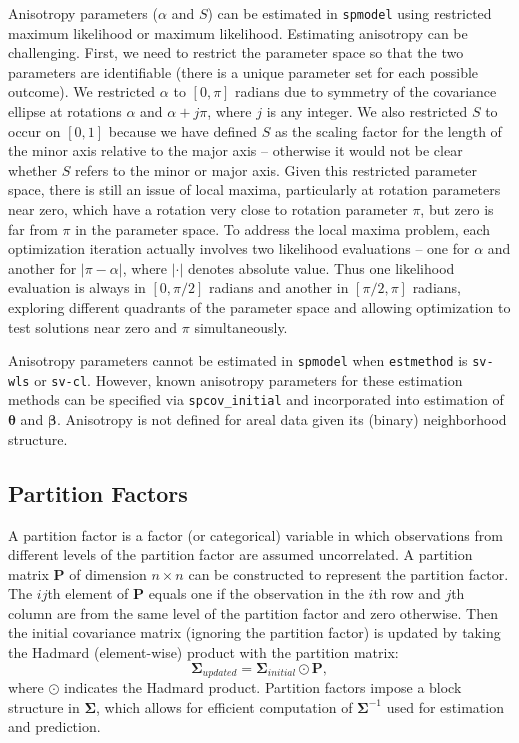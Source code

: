 \documentclass[10pt,letterpaper]{article}
\begin{document}
Anisotropy parameters (\(\alpha\) and \(S\)) can be estimated in
\texttt{spmodel} using restricted maximum likelihood or maximum
likelihood. Estimating anisotropy can be challenging. First, we need to
restrict the parameter space so that the two parameters are identifiable
(there is a unique parameter set for each possible outcome). We
restricted \(\alpha\) to \([0, \pi]\) radians due to symmetry of the
covariance ellipse at rotations \(\alpha\) and \(\alpha + j \pi\), where
\(j\) is any integer. We also restricted \(S\) to occur on \([0, 1]\)
because we have defined \(S\) as the scaling factor for the length of
the minor axis relative to the major axis -- otherwise it would not be
clear whether \(S\) refers to the minor or major axis. Given this
restricted parameter space, there is still an issue of local maxima,
particularly at rotation parameters near zero, which have a rotation
very close to rotation parameter \(\pi\), but zero is far from \(\pi\)
in the parameter space. To address the local maxima problem, each
optimization iteration actually involves two likelihood evaluations --
one for \(\alpha\) and another for \(|\pi - \alpha|\), where \(|\cdot|\)
denotes absolute value. Thus one likelihood evaluation is always in
\([0, \pi/2]\) radians and another in \([\pi/2, \pi]\) radians,
exploring different quadrants of the parameter space and allowing
optimization to test solutions near zero and \(\pi\) simultaneously.

Anisotropy parameters cannot be estimated in \texttt{spmodel} when
\texttt{estmethod} is \texttt{sv-wls} or \texttt{sv-cl}. However, known
anisotropy parameters for these estimation methods can be specified via
\texttt{spcov\_initial} and incorporated into estimation of
\(\boldsymbol{\theta}\) and \(\boldsymbol{\beta}\). Anisotropy is not
defined for areal data given its (binary) neighborhood structure.

\hypertarget{partition-factors}{%
\subsection{Partition Factors}\label{partition-factors}}

A partition factor is a factor (or categorical) variable in which
observations from different levels of the partition factor are assumed
uncorrelated. A partition matrix \(\mathbf{P}\) of dimension
\(n \times n\) can be constructed to represent the partition factor. The
\(ij\)th element of \(\mathbf{P}\) equals one if the observation in the
\(i\)th row and \(j\)th column are from the same level of the partition
factor and zero otherwise. Then the initial covariance matrix (ignoring
the partition factor) is updated by taking the Hadmard (element-wise)
product with the partition matrix: \begin{equation*}
 \boldsymbol{\Sigma}_{updated} = \boldsymbol{\Sigma}_{initial} \odot \mathbf{P},
\end{equation*} where \(\odot\) indicates the Hadmard product. Partition
factors impose a block structure in \(\boldsymbol{\Sigma}\), which
allows for efficient computation of \(\boldsymbol{\Sigma}^{-1}\) used
for estimation and prediction.
\end{document}
